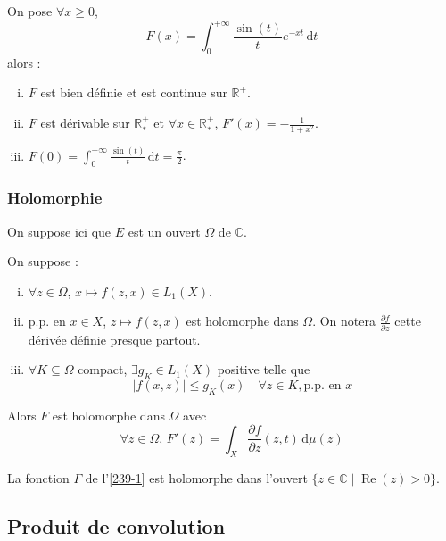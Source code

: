 
	\begin{application}
		On pose $\forall x \geq 0$,
		\[ F(x) = \int_0^{+\infty} \frac{\sin(t)}{t} e^{-xt} \, \mathrm{d}t \]
		alors :
		\begin{enumerate}[(i)]
			\item $F$ est bien définie et est continue sur $\mathbb{R}^+$.
			\item $F$ est dérivable sur $\mathbb{R}^+_*$ et $\forall x \in \mathbb{R}^+_*$, $F'(x) = -\frac{1}{1+x^2}$.
			\item $F(0) = \int_0^{+\infty} \frac{\sin(t)}{t} \, \mathrm{d}t = \frac{\pi}{2}$.
		\end{enumerate}
	\end{application}

	\subsubsection{Holomorphie}


	On suppose ici que $E$ est un ouvert $\Omega$ de $\mathbb{C}$.

	\begin{theorem}
		On suppose :
		\begin{enumerate}[(i)]
			\item $\forall z \in \Omega$, $x \mapsto f(z,x) \in L_1(X)$.
			\item p.p. en $x \in X$, $z \mapsto f(z,x)$ est holomorphe dans $\Omega$. On notera $\frac{\partial f}{\partial z}$ cette dérivée définie presque partout.
			\item $\forall K \subseteq \Omega$ compact, $\exists g_K \in L_1(X)$ positive telle que
			\[ \left| f(x,z) \right| \leq g_K(x) \quad \forall z \in K, \text{p.p. en } x \]
		\end{enumerate}
		Alors $F$ est holomorphe dans $\Omega$ avec
		\[ \forall z \in \Omega, \, F'(z) = \int_X \frac{\partial f}{\partial z}(z, t) \, \mathrm{d}\mu(z) \]
	\end{theorem}

	\begin{example}
		La fonction $\Gamma$ de l'\cref{239-1} est holomorphe dans l'ouvert $\{ z \in \mathbb{C} \mid \operatorname{Re}(z) > 0 \}$.
	\end{example}

	\subsection{Produit de convolution}

